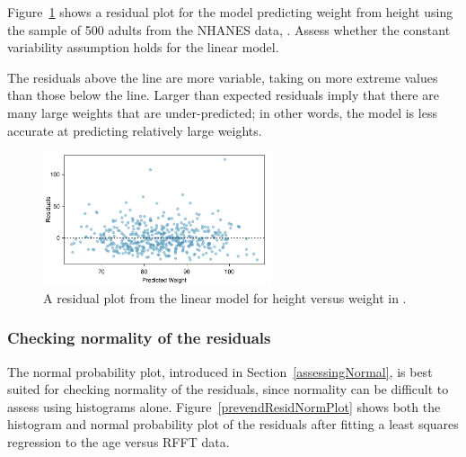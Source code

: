 \begin{examplewrap}
\begin{nexample}{Figure~\ref{nhanesHeightWeightResidualPlot} shows a residual plot for the model predicting weight from height using the sample of 500 adults from the NHANES data, . Assess whether the constant variability assumption holds for the linear model.}

The residuals above the line are more variable, taking on more extreme values than those below the line. Larger than expected residuals imply that there are many large weights that are under-predicted; in other words, the model is less accurate at predicting relatively large weights.
\end{nexample}
\end{examplewrap}

\begin{figure}[h]
	\centering
	\includegraphics[width=0.6\textwidth]
	{ch_simple_linear_regression_oi_biostat/figures/nhanesHeightWeightResidualPlot/nhanesHeightWeightResidualPlot.pdf}
	\caption{A residual plot from the linear model for height versus weight in .}
	\label{nhanesHeightWeightResidualPlot}
\end{figure}


\textD{\newpage}


\subsubsection{Checking normality of the residuals}


The normal probability plot, introduced in Section~\ref{assessingNormal}, is best suited for checking normality of the residuals, since normality can be difficult to assess using histograms alone. Figure~\ref{prevendResidNormPlot} shows both the histogram and normal probability plot of the residuals after fitting a least squares regression to the age versus RFFT data.  
 
